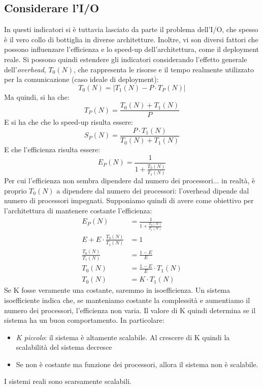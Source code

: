 \subsection{Considerare l'I/O}
In questi indicatori si è tuttavia lasciato da parte il problema dell'I/O, che spesso è il vero collo di bottiglia in
diverse architetture. Inoltre, vi son diversi fattori che possono influenzare l'efficienza e lo speed-up
dell'architettura, come il deployment reale. Si possono quindi estendere gli indicatori considerando l'effetto 
generale dell'\textit{overhead}, $T_0(N)$, che rappresenta le risorse e il tempo 
realmente utilizzato per la comunicazione 
(caso ideale di deployment):
\begin{equation}
T_0(N) = \left|T_1(N) - P \cdot T_P(N)\right|
\end{equation}
Ma quindi, si ha che:
\begin{equation}
 T_P(N) = \frac{T_0(N) + T_1(N)}{P}
\end{equation}
E si ha che che lo speed-up risulta essere:
\begin{equation}
 S_P(N) = \frac{P \cdot T_1(N)}{T_0(N) + T_1(N)}
\end{equation}
E che l'efficienza risulta essere:
\begin{equation}
E_P(N) = \frac{1}{1 + \frac{T_0(N)}{T_1(N)}}
\end{equation}
Per cui l'efficienza non sembra dipendere dal numero dei processori... in realtà,
è proprio $T_0(N)$ a dipendere dal numero dei processori: l'overhead dipende dal numero di processori impegnati.
Supponiamo quindi di avere come obiettivo per l'architettura di mantenere costante l'efficienza:
\begin{align}
                            E_P(N) &= \frac{1}{1 + \frac{T_0(N)}{T_1(N)}} \nonumber \\
 E + E \cdot \frac{T_0(N)}{T_1(N)} &= 1                                   \nonumber \\
             \frac{T_0(N)}{T_1(N)} &= \frac{1 - E}{E}                     \nonumber \\
                            T_0(N) &= \frac{1 - E}{E} \cdot T_1(N)        \nonumber \\
                            T_0(N) &= K \cdot T_1(N)
\end{align}
Se K fosse veramente una costante, saremmo in isoefficienza. Un sistema isoefficiente indica che, se manteniamo 
costante la complessità e aumentiamo il numero dei processori, l'efficienza non varia. Il valore di K quindi determina
se il sistema ha un buon comportamento. In particolare:
\begin{itemize}
 \item \textit{K piccolo}: il sistema è altamente scalabile. Al crescere di K quindi la scalabilità del sistema decresce
 \item Se non è costante ma funzione dei processori, allora il sistema non è scalabile.
\end{itemize}
I sistemi reali sono scarsamente scalabili.
